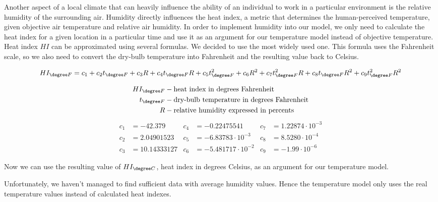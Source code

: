 Another aspect of a local climate that can heavily influence the ability of an individual to work in a particular environment is the relative humidity of the surrounding air. Humidity directly influences the heat index, a metric that determines the human-perceived temperature, given objective air temperature and relative air humidity. In order to implement humidity into our model, we only need to calculate the heat index for a given location in a particular time and use it as an argument for our temperature model instead of objective temperature. Heat index $HI$ can be approximated using several formulas. We decided to use the most widely used one. This formula uses the Fahrenheit scale, so we also need to convert the dry-bulb temperature into Fahrenheit and the resulting value back to Celsius.

$$HI_{\degree F}= c_1+c_{2}t_{\degree F}+c_{3}R+c_{4}t_{\degree F}R+c_{5}t_{\degree F}^2+c_{6}R^2+c_{7}t_{\degree F}^{2}R+c_{8}t_{\degree F}R^2+c_{9}t_{\degree F}^{2}R^2$$



\begin{align*}
HI_{\degree F} &- \text{heat index in degrees Fahrenheit}\\
t_{\degree F} &- \text{dry-bulb temperature in degrees Fahrenheit}\\
R &- \text{relative humidity expressed in percents}
\end{align*}
\begin{align*}
c_1 &= -42.379 & c_4 &= -0.22475541 & c_7 &= 1.22874 \cdot 10^{-3}\\
c_2 &= 2.04901523 & c_5 &= -6.83783 \cdot 10^{-3} & c_8 &= 8.5280 \cdot 10^{-4}\\
c_3 &= 10.14333127 & c_6 &= -5.481717 \cdot 10^{-2} & c_9 &= -1.99 \cdot 10^{-6}
\end{align*}

Now we can use the resulting value of $HI_{\degree C}$, heat index in degrees Celsius, as an argument for our temperature model.

Unfortunately, we haven't managed to find sufficient data with average humidity values. Hence the temperature model only uses the real temperature values instead of calculated heat indexes.
